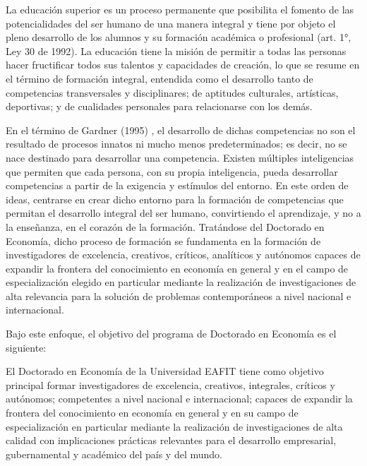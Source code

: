La educación superior es un proceso permanente que posibilita el fomento de las potencialidades del ser humano de una manera integral y tiene por objeto el pleno desarrollo de los alumnos y su formación académica o profesional (art. 1°, Ley 30 de 1992). La educación tiene la misión de permitir a todas las personas hacer fructificar todos sus talentos y capacidades de creación, lo que se resume en el término de formación integral, entendida como el desarrollo tanto de competencias transversales y disciplinares; de aptitudes culturales, artísticas, deportivas; y de cualidades personales para relacionarse con los demás.

En el término de Gardner (1995) , el desarrollo de dichas competencias no son el resultado de procesos innatos ni mucho menos predeterminados; es decir, no se nace destinado para desarrollar una competencia. Existen múltiples inteligencias que permiten que cada persona, con su propia inteligencia, pueda desarrollar competencias a partir de la exigencia y estímulos del entorno.  En este orden de ideas, centrarse en crear dicho entorno para la formación de competencias que permitan el desarrollo integral del ser humano, convirtiendo el aprendizaje, y no a la enseñanza, en el corazón de la formación. Tratándose del Doctorado en Economía, dicho proceso de formación se fundamenta en la formación de investigadores de excelencia, creativos, críticos, analíticos y autónomos capaces de expandir la frontera del conocimiento en economía en general y en el campo de especialización elegido en particular mediante la realización de investigaciones de alta relevancia para la solución de problemas contemporáneos a nivel nacional e internacional. 

Bajo este enfoque, el objetivo del programa de Doctorado en Economía es el siguiente: 

\begin{tcolorbox}[colback=blue!5!white,colframe=blue!75!black,title=Objetivo del programa]
  El Doctorado en Economía de la Universidad EAFIT tiene como objetivo principal formar investigadores de excelencia, creativos,  integrales, críticos y autónomos; competentes a nivel nacional e internacional; capaces de expandir la frontera del conocimiento en economía en general y en su campo de especialización en particular mediante la realización de investigaciones de alta calidad con implicaciones prácticas relevantes para el desarrollo empresarial, gubernamental y académico del país y del mundo.
\end{tcolorbox}


